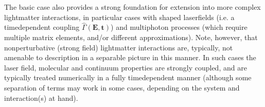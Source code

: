 \documentclass[letterpaper,table,10pt,english]{jupyterBook}
\begin{document}
\sphinxAtStartPar
The basic case also provides a strong foundation for extension into more complex light\sphinxhyphen{}matter interactions, in particular cases with shaped laser\sphinxhyphen{}fields (i.e. a time\sphinxhyphen{}dependent coupling \(\hat{\Gamma}(\boldsymbol{\mathbf{E,t}})\)) and multi\sphinxhyphen{}photon processes (which require multiple matrix elements, and/or different approximations). Note, however, that non\sphinxhyphen{}perturbative (strong field) light\sphinxhyphen{}matter interactions are, typically, not amenable to description in a separable picture in this manner. In such cases the laser field, molecular and continuum properties are strongly coupled, and are typically treated numerically in a fully time\sphinxhyphen{}dependent manner (although some separation of terms may work in some cases, depending on the system and interaction(s) at hand).
\end{document}
